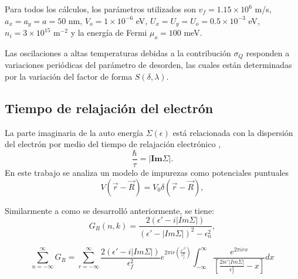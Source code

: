 \begin{frame}
  Para todos los cálculos, los parámetros utilizados son $v_{f}=1.15\times 10^{6}$ m/s, $a_{x}=a_{y}=a=50$ nm,
  $V_{o}=1\times10^{-6}$ eV, $U_{x}=U_{y}=U_{o}=0.5\times10^{-3}$ eV, $n_{i}=3\times10^{15}$ m$^{-2}$
  y la energía de Fermi $\mu_{o}=100$ meV.\\

  \vspace{0.5cm}

  Las oscilaciones a altas temperaturas debidas a la contribución $\sigma_{Q} $ responden a variaciones periódicas
  del parámetro de desorden, las cuales están determinadas por la variación del factor de forma $ S(\delta,\lambda)$.
\end{frame}

\subsection{Tiempo de relajación del electrón}

\begin{frame}
  La parte imaginaria de la auto energía $\Sigma(\epsilon)$ está relacionada con la dispersión del electrón
  por medio del tiempo de relajación electrónico \cite{Ando1974},
  \begin{equation}
    \frac{\hbar}{\tau} = |\textbf{Im}\Sigma|.
  \end{equation}
  En este trabajo se analiza un modelo de impurezas como potenciales puntuales
  \begin{equation}
    V(\Vec{r}-\Vec{R}) = V_0 \delta(\Vec{r}-\Vec{R}),
  \end{equation}
\end{frame}

\begin{frame}
  Similarmente a como se desarrolló anteriormente, se tiene:
  \begin{equation}
    G_{R}(n,k) = \frac{2(\epsilon' - i|Im\Sigma|)}{(\epsilon' - |Im\Sigma|)^{2} - \epsilon_{n}^{2}},
    \label{GRnk2}
  \end{equation}

  \begin{equation}
    \sum_{n=-\infty}^{\infty}G_{R}=\sum_{r=-\infty}^{\infty}\frac{2(\epsilon' - i|Im\Sigma|)}{\epsilon_{f}^{2}}e^{2\pi ir\left(\frac{\epsilon'^{2}}{\epsilon_{f}^{2}}\right)}\int_{-\infty}^{\infty}\frac{e^{2\pi irx}}{\left[\frac{2i\epsilon'|Im\Sigma|}{\epsilon_{f}^{2}}-x\right]}dx
    \label{GRPoisson}
  \end{equation}
\end{frame}

